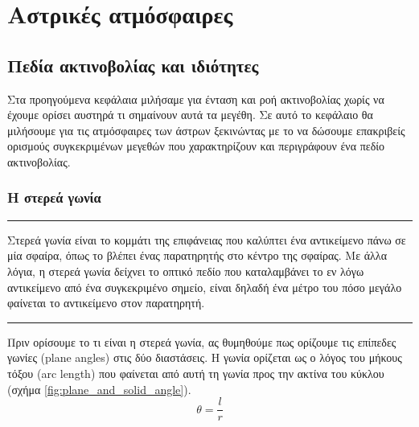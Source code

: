 \chapter{Αστρικές ατμόσφαιρες}
\label{ch:Chapter4}
{\hypersetup{linkcolor=black, pdfborder=0 0 1}
	\minitoc
}

\section{Πεδία ακτινοβολίας και ιδιότητες}
Στα προηγούμενα κεφάλαια μιλήσαμε για ένταση και ροή ακτινοβολίας χωρίς να έχουμε ορίσει αυστηρά τι σημαίνουν αυτά τα μεγέθη. Σε αυτό το κεφάλαιο θα μιλήσουμε για τις ατμόσφαιρες των άστρων ξεκινώντας με το να δώσουμε επακριβείς ορισμούς συγκεκριμένων μεγεθών που χαρακτηρίζουν και περιγράφουν ένα πεδίο ακτινοβολίας.

\subsection{Η στερεά γωνία}
{\color{red} \hrule}
Στερεά γωνία είναι το κομμάτι της επιφάνειας που καλύπτει ένα αντικείμενο πάνω σε μία σφαίρα, όπως το βλέπει ένας παρατηρητής στο κέντρο της σφαίρας. Με άλλα λόγια, η στερεά γωνία δείχνει το οπτικό πεδίο που καταλαμβάνει το εν λόγω αντικείμενο από ένα συγκεκριμένο σημείο, είναι δηλαδή ένα μέτρο του πόσο μεγάλο φαίνεται το αντικείμενο στον παρατηρητή.\\
 {\color{red} \hrule}
Πριν ορίσουμε το τι είναι η στερεά γωνία, ας θυμηθούμε πως ορίζουμε τις επίπεδες γωνίες (plane angles) στις δύο διαστάσεις. Η γωνία ορίζεται ως ο λόγος του μήκους τόξου (arc length) που φαίνεται από αυτή τη γωνία προς την ακτίνα του κύκλου (σχήμα \ref{fig:plane_and_solid_angle}). 
\begin{equation}
\label{eq:plane_angle}
    \theta = \frac{l}{r}
\end{equation}

